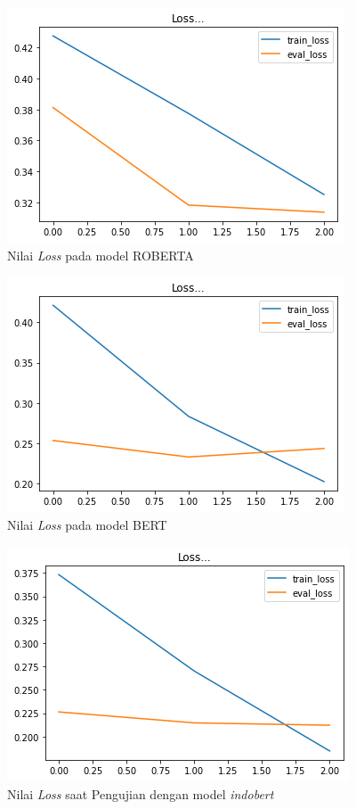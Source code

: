 \begin{figure}[h]
    \begin{center}
        \includegraphics[width= 0.9\linewidth]{gambar/loss_roberta522.png}
        \caption{Nilai \textit{Loss} pada model ROBERTA}
        \label{fig: loss_roberta}
    \end{center}
\end{figure}


\begin{figure}[h]
    \begin{center}
        \includegraphics[width= 0.9\linewidth]{gambar/loss_cahya_bert_522.png}
        \caption{Nilai \textit{Loss} pada model BERT}
        \label{fig: loss_bert}
    \end{center}
\end{figure}

\begin{figure}[h]
    \begin{center}
        \includegraphics[width= 0.9\linewidth]{gambar/loss_concat_awal.png}
        \caption{Nilai \textit{Loss} saat Pengujian dengan model \textit{indobert}}
        \label{fig: loss_bert_indobert}
    \end{center}
\end{figure}